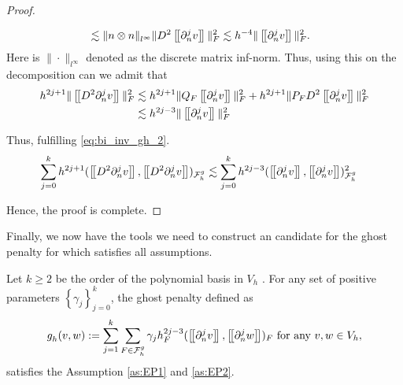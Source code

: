 \begin{proof}
\begin{enumerate}[label=\arabic*)]
\[\begin{split}
        & \lesssim  \| n \otimes n \|_{l^{\infty} }^{  }  \|  D^2 \left[\!\left[  \partial _{n}^{j} v  \right]\!\right]   \|_{ F  }^{ 2} \lesssim h^{-4} \|  \left[\!\left[  \partial ^{j}_{n} v  \right]\!\right]   \|_{ F }^{  2}.
            \end{split}
        \]
        Here is $\| \cdot  \|_{l^{\infty}  }^{  } $ denoted as the discrete matrix inf-norm.
        Thus, using this on the decomposition can we admit that
         \[
             \begin{split}
            h^{2j +1} \| \jump{D^2 \partial ^{j}_{n}  v}  \|_{ F }^{2  } & \lesssim h^{2j +1} \| Q_{F} \jump{ \partial ^{j}_{n}  v }  \|_{ F }^{2  } + h^{2j +1} \| P_{F} D^2 \jump{ \partial ^{j}_{n}  v }       \|_{ F }^{2  } \\
            &  \lesssim   h^{2j -3}  \| \jump{ \partial ^{j}_{n}v }   \|_{ F }^{ 2 }
             \end{split}
        \]

        Thus, fulfilling \eqref{eq:bi_inv_gh_2}.
        \[
            \begin{split}
         \sum_{j=0}^{k} h^{2j+1} ( \jump{   D^2 \partial ^{j}_{n}  v }, \jump{  D^2 \partial ^{j}_{n}  v}    )_{\mathcal{F}_{h}^{g}} & \lesssim  \sum_{j=0}^{k} h^{2j-3}  (\jump{    \partial ^{j}_{n}  v }, \jump{ \partial ^{j}_{n}  v }  )_{\mathcal{F} _{h}^{g}  }^{2  }
            \end{split}
        \]

    \end{enumerate}
    Hence, the proof is complete.

\end{proof}



Finally, we now have the tools we need to construct an candidate for the ghost penalty for which satisfies all assumptions.

\begin{proposition}
    Let $k\ge  2$ be the order of the polynomial basis in $V_{h}$ .
    For any set of positive parameters $\left\{ \gamma _{j} \right\} _{j=0}^{k}$, the ghost penalty defined as \[
    g^{}_{h}( v,w)  := \sum_{j=1}^{k} \sum_{F \in \mathcal{F} _{h}^{g}}^{} \gamma _{j} h^{2j-3}_{F} ( \left[\!\left[  \partial ^{j}_{n} v  \right]\!\right], \left[\!\left[  \partial ^{j}_{n} w  \right]\!\right]  ) _{F} \text{ for any } v,w \in V_{h},
    \]
    satisfies the Assumption \ref{as:EP1} and \ref{as:EP2}.
\end{proposition}

